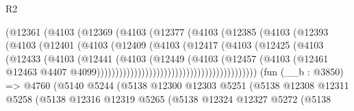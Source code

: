\begin{lexlean}{R2}
\begin{coremodule}
                                    (@12361
                                      (@4103
                                        (@12369
                                          (@4103
                                            (@12377
                                              (@4103
                                                (@12385
                                                  (@4103
                                                    (@12393
                                                      (@4103
                                                        (@12401
                                                          (@4103
                                                            (@12409
                                                              (@4103
                                                                (@12417
                                                                  (@4103
                                                                    (@12425
                                                                      (@4103
                                                                        (@12433
                                                                          (@4103
                                                                            (@12441
                                                                              (@4103
                                                                                (@12449
                                                                                  (@4103
                                                                                    (@12457
                                                                                      (@4103
                                                                                        (@12461
                                                                                          @12463
                                                                                          @4407
                                                                                          @4099)))))))))))))))))))))))))))))))))))))))))))
    (fun (__b : @3850) =>
    @4760
      (@5140
        @5244
        (@5138
          @12300
          @12303
          @5251
          (@5138
            @12308
            @12311
            @5258
            (@5138
              @12316
              @12319
              @5265
              (@5138
                @12324
                @12327
                @5272
                (@5138

\end{coremodule}
\end{lexlean}
